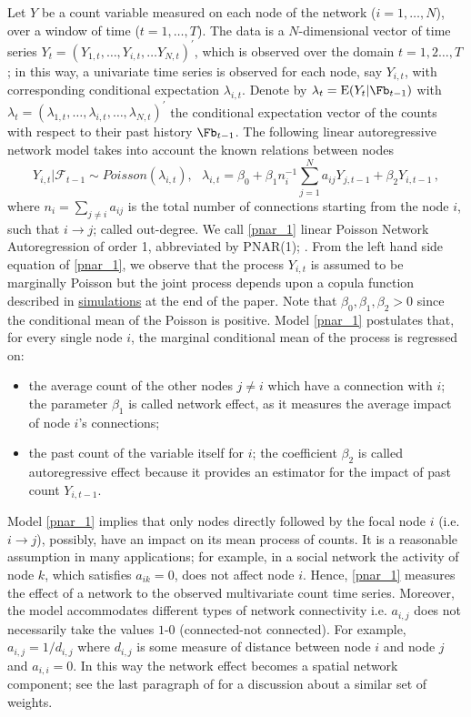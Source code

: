 Let $Y$ be  a count variable measured on each node of the network ($i=1,\dots, N$), over a window of time ($t=1,\dots,T$). The
data is a $N$-dimensional vector of time series $Y_t=(Y_{1,t},\dots,Y_{i,t},\dots Y_{N,t})^\prime$, which is observed over the domain $t=1,2\dots,T$; in this way, a univariate time series is observed for each node, say $Y_{i,t}$, with corresponding conditional expectation $\lambda_{i,t}$. Denote by
$ \lambda_t=\mathrm{E}(Y_t|\Fb_{t-1})$ with $\lambda_t=(\lambda_{1,t},\dots,\lambda_{i,t},\dots,\lambda_{N,t})^\prime$ the conditional expectation vector of the counts with respect to their past history  $\Fb_{t-1}$.
The following linear autoregressive network model  takes  into account the known relations between nodes
\begin{equation}
	Y_{i,t}|\mathcal{F}_{t-1}\sim Poisson(\lambda_{i,t}), ~~~ \lambda_{i,t}=\beta_0+\beta_1n_i^{-1}\sum_{j=1}^{N}a_{ij}Y_{j,t-1}+\beta_2Y_{i,t-1}\,,
	\label{pnar_1}
\end{equation}
where $n_i=\sum_{j\neq i}a_{ij}$ is the total number of connections starting from the node $i$, such that $i\to j$; called out-degree. We call \eqref{pnar_1} linear Poisson Network Autoregression of order 1, abbreviated by PNAR(1); \citep{armillotta_fokianos_2021}. From the left hand side equation of \eqref{pnar_1}, we observe that the process $Y_{i,t}$ is assumed to be marginally Poisson but the joint process depends upon a copula function described in \hyperref[sec: Generate data]{simulations} at the end of the paper.  
Note that $\beta_0,\beta_1,\beta_2 >0$ since the conditional mean of the Poisson is positive.
Model \eqref{pnar_1} postulates that, for every single node $i$, the marginal  conditional mean of the process is regressed on:
\begin{itemize}
	\item the average count of the other nodes $j\neq i$ which have a connection with $i$; the parameter $\beta_1$ is called network effect, as it measures the average impact of node $i$'s connections;
	\item  the past count of the variable itself for $i$;  the coefficient $\beta_2$ is called autoregressive effect because it provides an estimator  for the impact of past count $Y_{i,t-1}$.
\end{itemize}
Model \eqref{pnar_1} implies  that only  nodes directly followed by the focal node $i$ (i.e. $i \to j$),  possibly, have an impact on its mean process of counts. It is a reasonable assumption in many applications; for example, in a social network the activity of node $k$, which satisfies  $a_{ik}=0$, does not affect node $i$. Hence, \eqref{pnar_1} measures the effect of a network to the observed multivariate count time series. 
Moreover, the model accommodates different types of network connectivity i.e. $a_{i,j}$ does not necessarily take the values  $1$-$0$ (connected-not connected). For example,  $a_{i,j}=1/d_{i,j}$ where $d_{i,j}$ is some measure of distance between node $i$ and node $j$ and  $a_{i,i}=0$. In this way the network effect becomes a spatial network component; see  the last  paragraph of \citet[p.3]{Knightetal(2020)} for a discussion about a similar set of weights.

